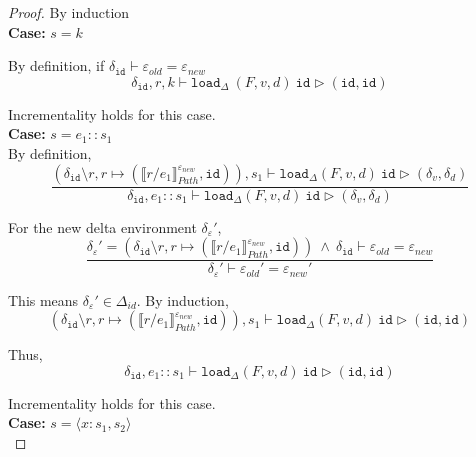 \documentclass[10pt,twoside,a4paper]{article}
\theoremstyle{theorem}
\theoremstyle{lemma}
\theoremstyle{property}
\theoremstyle{definition}
\theoremstyle{assumption}
\def\id{\mathtt{id}}
\begin{document}
\begin{proof}
	By induction\\

	\textbf{Case: } $s = k$
		
		By definition, if $\delta_{\id} \vdash \varepsilon_{old} = \varepsilon_{new}$
		\begin{displaymath}
			\delta_{\id}, r, k \vdash \mathtt{load}_\Delta~ (F,v,d)~ \id \rhd (\id, \id)
		\end{displaymath}

		Incrementality holds for this case.\\

	\textbf{Case: } $s = e_1::s_1$\\
	
		By definition,
		\begin{displaymath}
		\frac
		{(\delta_{\id} \setminus r, r \mapsto (\llbracket r/e_1 \rrbracket^{\varepsilon_{new}}_{Path}, \id)) , s_1 \vdash \mathtt{load}_\Delta (F,v,d)~ \id \rhd (\delta_v,\delta_d)}
		{\delta_{\id}, e_1::s_1 \vdash \mathtt{load}_\Delta (F,v,d)~ \id \rhd (\delta_v,\delta_d)}
		\end{displaymath}

		For the new delta environment $\delta_\varepsilon'$,
		\begin{displaymath}
		\frac{
			\delta_\varepsilon' = (\delta_{\id} \setminus r, r \mapsto (\llbracket r/e_1 \rrbracket^{\varepsilon_{new}}_{Path}, \id)) 
			~\wedge~ \delta_{\id} \vdash \varepsilon_{old} = \varepsilon_{new}
		}
		{	\delta_\varepsilon' \vdash \varepsilon_{old}' = \varepsilon_{new}' }
		\end{displaymath}

		This means $\delta_\varepsilon' \in \Delta_{id}$. By induction,
		\begin{displaymath}
		(\delta_{\id} \setminus r, r \mapsto (\llbracket r/e_1 \rrbracket^{\varepsilon_{new}}_{Path}, \id)) , s_1 \vdash \mathtt{load}_\Delta (F,v,d)~ \id \rhd (\id,\id)
		\end{displaymath}

		Thus, 
		\begin{displaymath}
		\delta_{\id}, e_1::s_1 \vdash \mathtt{load}_\Delta (F,v,d)~ \id \rhd (\id,\id)
		\end{displaymath}
		
		Incrementality holds for this case.\\

	\textbf{Case: } $s = \langle x : s_1, s_2 \rangle$\\


\end{proof}
\end{document}
